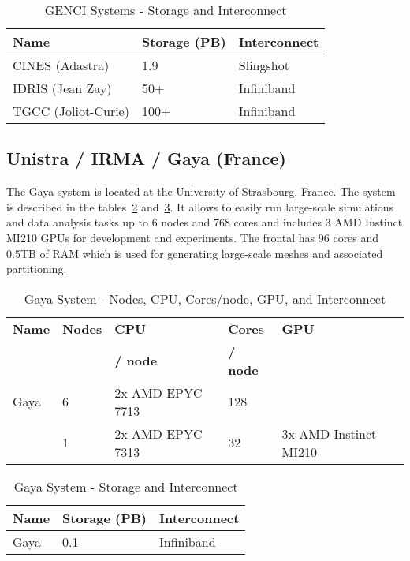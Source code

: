     \begin{table}[h!]
        \centering
        \begin{tabular}{l l l}
        \toprule
        \textbf{Name} & \textbf{Storage (PB)} & \textbf{Interconnect} \\
        \midrule
        CINES (Adastra) & 1.9 & Slingshot \\
        IDRIS (Jean Zay) & 50+ & Infiniband \\
        TGCC (Joliot-Curie) & 100+ & Infiniband \\
        \bottomrule
        \end{tabular}
        \caption{GENCI Systems - Storage and Interconnect}
        \label{tab:genci_storage_interconnect}
    \end{table}

\subsection*{Unistra / IRMA / Gaya (France)}
\label{sec:arch:gaya}

The Gaya system is located at the University of Strasbourg, France. The system is described in the tables~\ref{tab:gaya_flops_cpu_gpu} and~\ref{tab:gaya_storage_interconnect}. It allows to easily run large-scale simulations and data analysis tasks up to 6 nodes and 768 cores and includes 3 AMD Instinct MI210 GPUs for development and experiments. 
The frontal has 96 cores and 0.5TB of RAM which is used for generating large-scale meshes and associated partitioning.

\begin{table}[h!]
    \centering
    \begin{tabular}{l l l l l}
    \toprule
    \textbf{Name} & \textbf{Nodes} & \textbf{CPU} & \textbf{Cores} & \textbf{GPU} \\
    &  & \textbf{/ node}  & \textbf{/ node} &  \\
    \midrule
    Gaya &  6 & 2x AMD EPYC 7713 & 128 &  \\
         &  1 & 2x AMD EPYC 7313 & 32 & 3x AMD Instinct MI210 \\
    \bottomrule
    \end{tabular}
    \caption{Gaya System - Nodes, CPU, Cores/node, GPU, and Interconnect} 
    \label{tab:gaya_flops_cpu_gpu}
\end{table}

    \begin{table}[h!]
        \centering
        \begin{tabular}{l l l}
        \toprule
        \textbf{Name} & \textbf{Storage (PB)} & \textbf{Interconnect} \\
        \midrule
        Gaya & 0.1 & Infiniband \\
        \bottomrule
    \end{tabular}
    \caption{Gaya System - Storage and Interconnect}
    \label{tab:gaya_storage_interconnect}
    \end{table}

